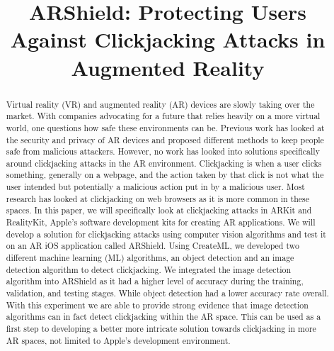 \documentclass[conference]{IEEEtran}
\begin{document}
\title{ARShield: Protecting Users Against Clickjacking Attacks in Augmented Reality}

\author{
}


\maketitle

\begin{abstract}
Virtual reality (VR) and augmented reality (AR) devices are slowly taking over the market. With companies advocating for a future that relies heavily on a more virtual world, one questions how safe these environments can be. Previous work has looked at the security and privacy of AR devices and proposed different methods to keep people safe from malicious attackers. However, no work has looked into solutions specifically around clickjacking attacks in the AR environment. Clickjacking is when a user clicks something, generally on a webpage, and the action taken by that click is not what the user intended but potentially a malicious action put in by a malicious user. Most research has looked at clickjacking on web browsers as it is more common in these spaces. In this paper, we will specifically look at clickjacking attacks in ARKit and RealityKit, Apple's software development kits for creating AR applications. We will develop a solution for clickjacking attacks using computer vision algorithms and test it on an AR iOS application called ARShield. Using CreateML, we developed two different machine learning (ML) algorithms, an object detection and an image detection algorithm to detect clickjacking. We integrated the image detection algorithm into ARShield as it had a higher level of accuracy during the training, validation, and testing stages. While object detection had a lower accuracy rate overall. With this experiment we are able to provide strong evidence that image detection algorithms can in fact detect clickjacking within the AR space. This can be used as a first step to developing a better more intricate solution towards clickjacking in more AR spaces, not limited to Apple's development environment. 

\end{abstract}
\end{document}
